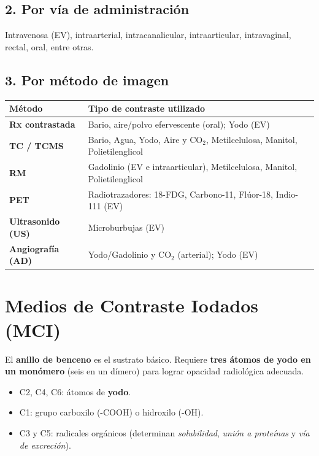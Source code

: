 \subsection*{2. Por vía de administración}

Intravenosa (EV), intraarterial, intracanalicular, intraarticular, intravaginal, rectal, oral, entre otras.

\subsection*{3. Por método de imagen}

\renewcommand{\arraystretch}{1.35}
\begin{center}
\begin{tabular}{>{\bfseries}p{2.5cm} p{9.5cm}}
\hline
Método & Tipo de contraste utilizado \\
\hline
Rx contrastada & Bario, aire/polvo efervescente (oral); Yodo (EV) \\
\hline
TC / TCMS & Bario, Agua, Yodo, Aire y CO$_2$, Metilcelulosa, Manitol, Polietilenglicol \\
\hline
RM & Gadolinio (EV e intraarticular), Metilcelulosa, Manitol, Polietilenglicol \\
\hline
PET & Radiotrazadores: 18-FDG, Carbono-11, Flúor-18, Indio-111 (EV) \\
\hline
Ultrasonido (US) & Microburbujas (EV) \\
\hline
Angiografía (AD) & Yodo/Gadolinio y CO$_2$ (arterial); Yodo (EV) \\
\hline
\end{tabular}
\end{center}

\section*{Medios de Contraste Iodados (MCI)}

El \textbf{anillo de benceno} es el sustrato básico. Requiere \textbf{tres átomos de yodo en un monómero} (seis en un dímero) para lograr opacidad radiológica adecuada.

\begin{itemize}[noitemsep]
  \item C2, C4, C6: átomos de \textbf{yodo}.
  \item C1: grupo carboxilo (-COOH) o hidroxilo (-OH).
  \item C3 y C5: radicales orgánicos (determinan \textit{solubilidad}, \textit{unión a proteínas} y \textit{vía de excreción}).
\end{itemize}

